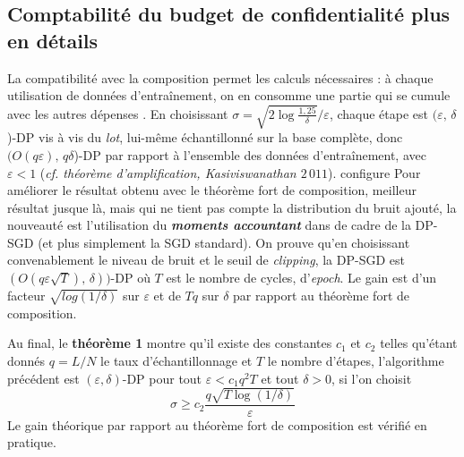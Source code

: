 \documentclass[a4paper,11pt]{article} %
\newcommand{\evid}[1]{\colorbox{blue!10}{\textbf{#1}}}
\begin{document}
\subsection{Comptabilité du budget de confidentialité plus en détails}
%
La compatibilité avec la composition permet les calculs nécessaires : à chaque utilisation de données d'entraînement, on en consomme une partie qui se cumule avec les autres \og dépenses \fg{}. En choisissant $\sigma = \sqrt{2\log \frac{1,25}{\delta}}/\varepsilon$, chaque étape est $(\varepsilon,\,\delta$)-DP vis à vis du \emph{lot}, lui-même échantillonné sur la base complète, donc $(O(q\varepsilon),\,q\delta$)-DP par rapport à l'ensemble des données d'entraînement, avec $\varepsilon < 1$ (\emph{cf. théorème d'amplification, Kasiviswanathan $2\,011$}).
configure
Pour améliorer le résultat obtenu avec le théorème fort de composition, meilleur résultat jusque là, mais qui ne tient pas compte la distribution du bruit ajouté, la nouveauté est l'utilisation du \evid{\emph{moments accountant}} dans de cadre de la DP-SGD (et plus simplement la SGD standard). On prouve qu'en choisissant convenablement le niveau de bruit et le seuil de \emph{clipping}, la DP-SGD est $(O(q\varepsilon\sqrt{T}), \,\delta))$-DP où $T$ est le nombre de cycles, d'\emph{epoch}. Le gain est d'un facteur $\sqrt{log(1/\delta)}$ sur $\varepsilon$ et de $Tq$ sur $\delta$ par rapport au théorème fort de composition.

Au final, le \textbf{théorème 1} montre qu'il existe des constantes $c_1$ et $c_2$ telles qu'étant donnés $q=L/N$ le taux d'échantillonnage et $T$ le nombre d'étapes, l'algorithme précédent est $(\varepsilon, \delta)$-DP pour tout $\varepsilon < c_1 q^2 T$ et tout $\delta > 0$, si l'on choisit
\[ \sigma \geqslant c_2 \dfrac{q\sqrt{T \log(1/\delta)}}{\varepsilon} \]
Le gain théorique par rapport au théorème fort de composition est vérifié en pratique.
\end{document}
